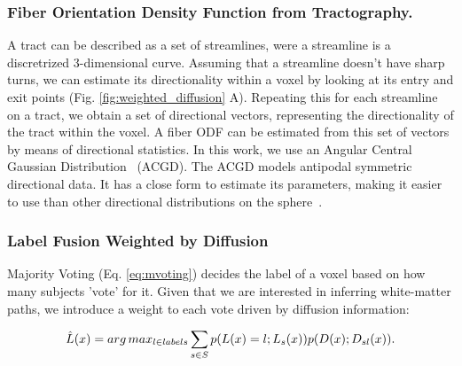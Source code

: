 \subsubsection{Fiber Orientation Density Function from Tractography.}
A tract can be described as a set of streamlines, were a streamline is a
discretrized 3-dimensional curve. Assuming that a streamline doesn't have sharp
turns, we can estimate its directionality within a voxel by looking at its
entry and exit points (Fig. \ref{fig:weighted_diffusion} A). Repeating this for each streamline
on a tract, we obtain a set of directional vectors, representing the directionality
of the tract within the voxel. A fiber ODF can be estimated from this set of
vectors by means of directional statistics. In this work, we use an
Angular Central Gaussian Distribution~\cite{Mardia1999} (ACGD). The ACGD models
antipodal symmetric directional data. It has a close form to estimate its
parameters, making it easier to use than other directional distributions on the
sphere~\cite{Mardia1999}.
    
\subsubsection{Label Fusion Weighted by Diffusion}
Majority Voting (Eq. \ref{eq:mvoting}) decides the label of a voxel based on
how many subjects 'vote' for it. Given that we are interested in inferring
white-matter paths, we introduce a weight to each vote driven by diffusion
information:


\begin{equation}
\label{eq:mvoting_weighted}
\hat L(x) = arg\,max_{l \in labels} \sum_{s\in S} p(L(x) = l ; L_s(x)) p(D(x) ; D_{sl}(x)).
\end{equation}

